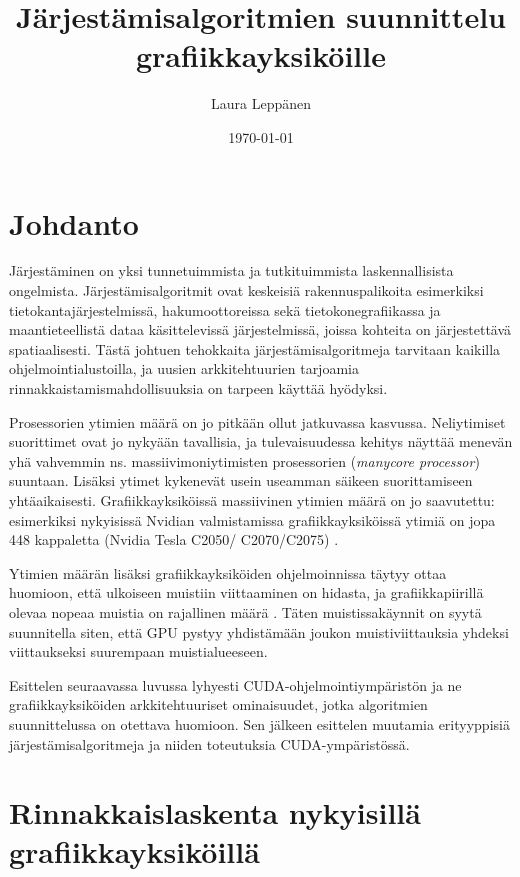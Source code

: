 \documentclass[a4paper,11pt]{article}
\begin{document}
\title{Järjestämisalgoritmien suunnittelu grafiikkayksiköille}
\author{Laura Leppänen}
\date{\today}
\maketitle

\tableofcontents
\onehalfspacing

\newpage

\section{Johdanto}

Järjestäminen on yksi tunnetuimmista ja tutkituimmista laskennallisista ongelmista. Järjestämisalgoritmit ovat keskeisiä rakennuspalikoita esimerkiksi tietokantajärjestelmissä, hakumoottoreissa sekä tietokonegrafiikassa ja maantieteellistä dataa käsittelevissä järjestelmissä, joissa kohteita on järjestettävä spatiaalisesti. Tästä johtuen tehokkaita järjestämisalgoritmeja tarvitaan kaikilla ohjelmointialustoilla, ja uusien arkkitehtuurien tarjoamia rinnakkaistamismahdollisuuksia on tarpeen käyttää hyödyksi.

Prosessorien ytimien määrä on jo pitkään ollut jatkuvassa kasvussa. Neliytimiset suorittimet ovat jo nykyään tavallisia, ja tulevaisuudessa kehitys näyttää menevän yhä vahvemmin ns. massiivimoniytimisten prosessorien (\emph{\foreignlanguage{english}{manycore processor}}) suuntaan. Lisäksi ytimet kykenevät usein useamman säikeen suorittamiseen yhtäaikaisesti. Grafiikkayksiköissä massiivinen ytimien määrä on jo saavutettu: esimerkiksi nykyisissä Nvidian valmistamissa grafiikkayksiköissä ytimiä on jopa 448 kappaletta (Nvidia Tesla C2050/ C2070/C2075) \cite{nvidiafermi2010}.

Ytimien määrän lisäksi grafiikkayksiköiden ohjelmoinnissa täytyy ottaa huomioon, että ulkoiseen muistiin viittaaminen on hidasta, ja grafiikkapiirillä olevaa nopeaa muistia on rajallinen määrä \cite{leischner2010}. Täten muistissakäynnit on syytä suunnitella siten, että GPU pystyy yhdistämään joukon muistiviittauksia yhdeksi viittaukseksi suurempaan muistialueeseen.

Esittelen seuraavassa luvussa lyhyesti CUDA-ohjelmointiympäristön ja ne grafiikkayksiköiden arkkitehtuuriset ominaisuudet, jotka algoritmien suunnittelussa on otettava huomioon. Sen jälkeen esittelen muutamia erityyppisiä järjestämisalgoritmeja ja niiden toteutuksia CUDA-ympäristössä.

\section{Rinnakkaislaskenta nykyisillä grafiikkayksiköillä}
\end{document}
